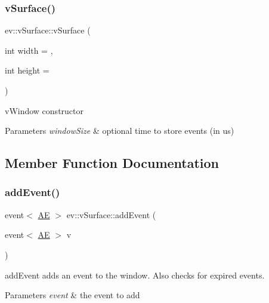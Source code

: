 \subsubsection{\texorpdfstring{v\+Surface()}{vSurface()}}
{\footnotesize\ttfamily ev\+::v\+Surface\+::v\+Surface (\begin{DoxyParamCaption}\item[{int}]{width = {},  }\item[{int}]{height = {} }\end{DoxyParamCaption})}



v\+Window constructor 


\begin{DoxyParams}{Parameters}
{\em window\+Size} & optional time to store events (in us) \\
\hline
\end{DoxyParams}


\subsection{Member Function Documentation}
\mbox{\label{classev_1_1vSurface_a60d2f3d18c68d18678040cfabf6d35ea}} 
\subsubsection{\texorpdfstring{add\+Event()}{addEvent()}}
{\footnotesize\ttfamily event$<$ \hyperlink{classev_1_1AddressEvent}{AE} $>$ ev\+::v\+Surface\+::add\+Event (\begin{DoxyParamCaption}\item[{event$<$ \hyperlink{classev_1_1AddressEvent}{AE} $>$}]{v }\end{DoxyParamCaption})}



add\+Event adds an event to the window. Also checks for expired events. 


\begin{DoxyParams}{Parameters}
{\em event} & the event to add \\
\hline
\end{DoxyParams}
\mbox{\label{classev_1_1vSurface_a523c84d62fa48db30913dee7e694b895}} 
